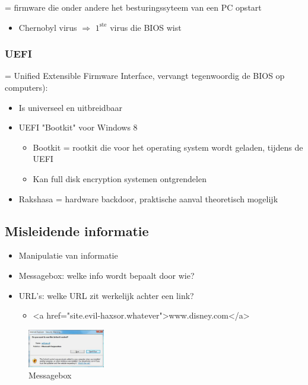 \documentclass{article}
\begin{document}
= firmware die onder andere het besturingssyteem van een PC opstart

\begin{itemize}
    \item Chernobyl virus $\Rightarrow$ $\text{1}^{\text{ste}}$ virus die BIOS wist
\end{itemize}

\subsubsection{UEFI}

= Unified Extensible Firmware Interface, vervangt tegenwoordig de BIOS op computers):

\begin{itemize}
    \item Is universeel en uitbreidbaar
    \item UEFI "Bootkit" voor Windows 8 
    \begin{itemize}
        \item Bootkit = rootkit die voor het operating system wordt geladen, tijdens de UEFI
        \item Kan full disk encryption systemen ontgrendelen
    \end{itemize}
    \item Rakshasa = hardware backdoor, praktische aanval theoretisch mogelijk
\end{itemize}

\subsection{Misleidende informatie}

\begin{itemize}
    \item Manipulatie van informatie
    \item Messagebox: welke info wordt bepaalt door wie?
    \item URL's: welke URL zit werkelijk achter een link?
    \begin{itemize}
        \item <a href="site.evil-haxsor.whatever">www.disney.com</a>
    \end{itemize}
\end{itemize}

\begin{figure}[H]
    \centering
    \includegraphics[width=0.3\textwidth]{messagebox.png}
    \caption{Messagebox}
\end{figure}
\end{document}
